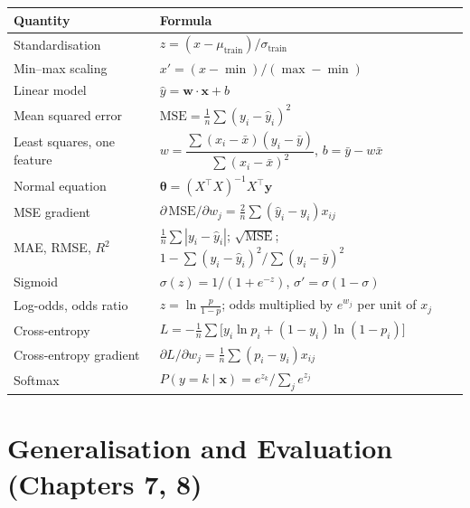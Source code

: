 \begin{longtable}{@{}L{4.0cm}L{11.0cm}@{}}
\toprule
{}
\textbf{Quantity} & \textbf{Formula} \\
\midrule
\endhead
Standardisation & $z = (x - \mu_{\text{train}})/\sigma_{\text{train}}$ \\
Min--max scaling & $x' = (x - \min)/(\max - \min)$ \\
Linear model & $\hat{y} = \mathbf{w}\cdot\mathbf{x} + b$ \\
Mean squared error & $\text{MSE} = \tfrac{1}{n}\sum (y_i - \hat{y}_i)^2$ \\
Least squares, one feature & $w = \dfrac{\sum (x_i - \bar{x})(y_i - \bar{y})}{\sum (x_i - \bar{x})^2}$, \quad $b = \bar{y} - w\bar{x}$ \\
Normal equation & $\boldsymbol{\theta} = (X^{\top}X)^{-1}X^{\top}\mathbf{y}$ \\
MSE gradient & $\partial\,\text{MSE}/\partial w_j = \tfrac{2}{n}\sum(\hat{y}_i - y_i)x_{ij}$ \\
MAE, RMSE, $R^2$ & $\tfrac{1}{n}\sum|y_i - \hat{y}_i|$; \quad $\sqrt{\text{MSE}}$; \quad $1 - \sum(y_i - \hat{y}_i)^2 / \sum(y_i - \bar{y})^2$ \\
Sigmoid & $\sigma(z) = 1/(1 + e^{-z})$, \quad $\sigma' = \sigma(1 - \sigma)$ \\
Log-odds, odds ratio & $z = \ln\frac{p}{1-p}$; \quad odds multiplied by $e^{w_j}$ per unit of $x_j$ \\
Cross-entropy & $L = -\tfrac{1}{n}\sum\big[y_i\ln p_i + (1 - y_i)\ln(1 - p_i)\big]$ \\
Cross-entropy gradient & $\partial L/\partial w_j = \tfrac{1}{n}\sum(p_i - y_i)x_{ij}$ \\
Softmax & $P(y = k \mid \mathbf{x}) = e^{z_k}/\sum_j e^{z_j}$ \\
\bottomrule
\end{longtable}

\section{Generalisation and Evaluation (Chapters 7, 8)}

